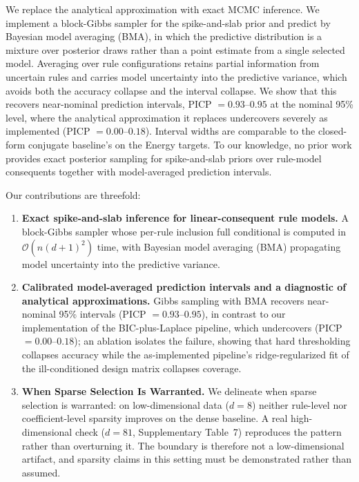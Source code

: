 \documentclass[review,1p,times]{elsarticle}
\begin{document}
We replace the analytical approximation with exact MCMC inference. We implement a block-Gibbs sampler for the spike-and-slab prior and predict by Bayesian model averaging (BMA), in which the predictive distribution is a mixture over posterior draws rather than a point estimate from a single selected model. Averaging over rule configurations retains partial information from uncertain rules and carries model uncertainty into the predictive variance, which avoids both the accuracy collapse and the interval collapse.
We show that this recovers near-nominal prediction intervals, PICP $=0.93$--$0.95$ at the nominal 95\% level, where the analytical approximation it replaces undercovers severely as implemented (PICP $=0.00$--$0.18$).
Interval widths are comparable to the closed-form conjugate baseline's on the Energy targets. To our knowledge, no prior work provides exact posterior sampling for spike-and-slab priors over rule-model consequents together with model-averaged prediction intervals.

Our contributions are threefold:
\begin{enumerate}
\item \textbf{Exact spike-and-slab inference for linear-consequent rule models.} A block-Gibbs sampler whose per-rule inclusion full conditional is computed in $\mathcal{O}(n(d+1)^2)$ time, with Bayesian model averaging (BMA) propagating model uncertainty into the predictive variance.
\item \textbf{Calibrated model-averaged prediction intervals and a diagnostic of analytical approximations.} Gibbs sampling with BMA recovers near-nominal 95\% intervals (PICP $=0.93$--$0.95$), in contrast to our implementation of the BIC-plus-Laplace pipeline, which undercovers (PICP $=0.00$--$0.18$); an ablation isolates the failure, showing that hard thresholding collapses accuracy while the as-implemented pipeline's ridge-regularized fit of the ill-conditioned design matrix collapses coverage.
\item \textbf{When Sparse Selection Is Warranted.}
We delineate when sparse selection is warranted: on low-dimensional data ($d=8$) neither rule-level nor coefficient-level sparsity improves on the dense baseline.
A real high-dimensional check ($d=81$, Supplementary Table~7) reproduces the pattern rather than overturning it.
The boundary is therefore not a low-dimensional artifact, and sparsity claims in this setting must be demonstrated rather than assumed.
\end{enumerate}
\end{document}
